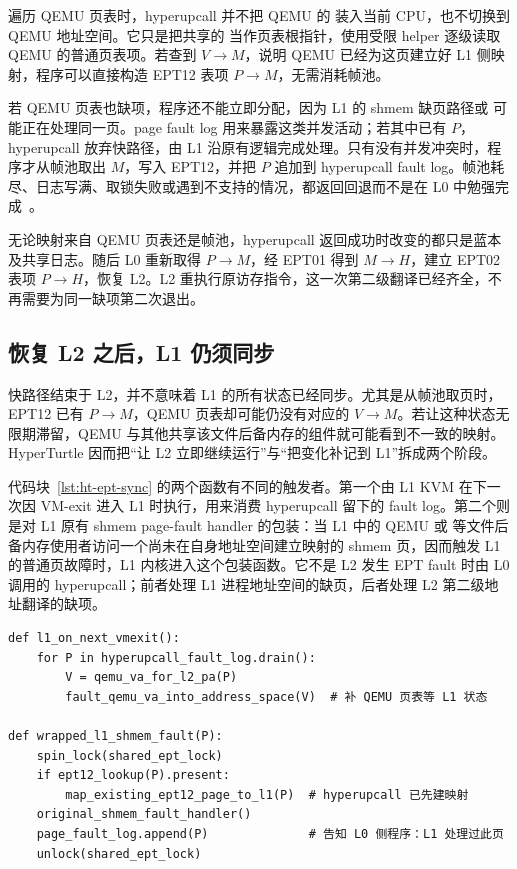 遍历 QEMU 页表时，hyperupcall 并不把 QEMU 的  装入当前 CPU，也不切换到 QEMU 地址空间。它只是把共享的  当作页表根指针，使用受限 helper 逐级读取 QEMU 的普通页表项。若查到 $V\rightarrow M$，说明 QEMU 已经为这页建立好 L1 侧映射，程序可以直接构造 EPT12 表项 $P\rightarrow M$，无需消耗帧池。

若 QEMU 页表也缺项，程序还不能立即分配，因为 L1 的 shmem 缺页路径或  可能正在处理同一页。page fault log 用来暴露这类并发活动；若其中已有 $P$，hyperupcall 放弃快路径，由 L1 沿原有逻辑完成处理。只有没有并发冲突时，程序才从帧池取出 $M$，写入 EPT12，并把 $P$ 追加到 hyperupcall fault log。帧池耗尽、日志写满、取锁失败或遇到不支持的情况，都返回回退而不是在 L0 中勉强完成~\cite{source8}。

无论映射来自 QEMU 页表还是帧池，hyperupcall 返回成功时改变的都只是蓝本及共享日志。随后 L0 重新取得 $P\rightarrow M$，经 EPT01 得到 $M\rightarrow H$，建立 EPT02 表项 $P\rightarrow H$，恢复 L2。L2 重执行原访存指令，这一次第二级翻译已经齐全，不再需要为同一缺项第二次退出。

\subsection{恢复 L2 之后，L1 仍须同步}\label{sec:ht-ept-sync}

快路径结束于 L2，并不意味着 L1 的所有状态已经同步。尤其是从帧池取页时，EPT12 已有 $P\rightarrow M$，QEMU 页表却可能仍没有对应的 $V\rightarrow M$。若让这种状态无限期滞留，QEMU 与其他共享该文件后备内存的组件就可能看到不一致的映射。HyperTurtle 因而把“让 L2 立即继续运行”与“把变化补记到 L1”拆成两个阶段。

代码块~\ref{lst:ht-ept-sync} 的两个函数有不同的触发者。第一个由 L1 KVM 在下一次因 VM-exit 进入 L1 时执行，用来消费 hyperupcall 留下的 fault log。第二个则是对 L1 原有 shmem page-fault handler 的包装：当 L1 中的 QEMU 或  等文件后备内存使用者访问一个尚未在自身地址空间建立映射的 shmem 页，因而触发 L1 的普通页故障时，L1 内核进入这个包装函数。它不是 L2 发生 EPT fault 时由 L0 调用的 hyperupcall；前者处理 L1 进程地址空间的缺页，后者处理 L2 第二级地址翻译的缺项。

\begin{lstlisting}[style=pseudopy,caption={L1 后续补偿与 shmem 缺页路径的同步（逻辑伪代码）},label={lst:ht-ept-sync}]
def l1_on_next_vmexit():
    for P in hyperupcall_fault_log.drain():
        V = qemu_va_for_l2_pa(P)
        fault_qemu_va_into_address_space(V)  # 补 QEMU 页表等 L1 状态

def wrapped_l1_shmem_fault(P):
    spin_lock(shared_ept_lock)
    if ept12_lookup(P).present:
        map_existing_ept12_page_to_l1(P)  # hyperupcall 已先建映射
    original_shmem_fault_handler()
    page_fault_log.append(P)              # 告知 L0 侧程序：L1 处理过此页
    unlock(shared_ept_lock)
\end{lstlisting}

